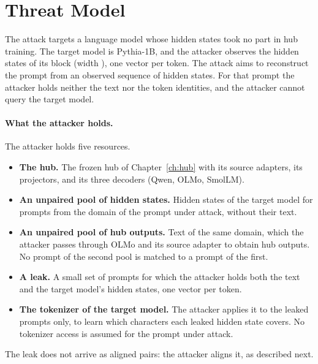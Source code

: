 \section{Threat Model}\label{sec:attack:threat}

The attack targets a language model whose hidden states took no part in hub training.
The target model is Pythia-1B, and the attacker observes the hidden states of its block  (width ), one vector per token. %
The attack aims to reconstruct the prompt from an observed sequence of hidden states.
For that prompt the attacker holds neither the text nor the token identities, and the attacker cannot query the target model.

\paragraph{What the attacker holds.} The attacker holds five resources.
\begin{itemize}
\item \textbf{The hub.} The frozen hub of Chapter~\ref{ch:hub} with its source adapters, its projectors, and its three decoders (Qwen, OLMo, SmolLM).
\item \textbf{An unpaired pool of hidden states.} Hidden states of the target model for prompts from the domain of the prompt under attack, without their text.
\item \textbf{An unpaired pool of hub outputs.} Text of the same domain, which the attacker passes through OLMo and its source adapter to obtain hub outputs.
No prompt of the second pool is matched to a prompt of the first.
\item \textbf{A leak.} A small set of prompts for which the attacker holds both the text and the target model's hidden states, one vector per token.
\item \textbf{The tokenizer of the target model.} The attacker applies it to the leaked prompts only, to learn which characters each leaked hidden state covers.
No tokenizer access is assumed for the prompt under attack.
\end{itemize}
The leak does not arrive as aligned pairs: the attacker aligns it, as described next.

